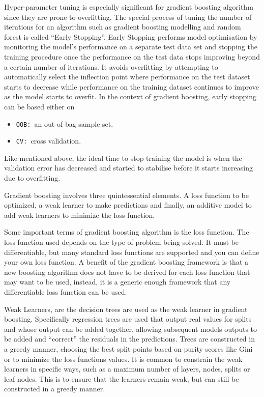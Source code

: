 \documentclass[12pt]{article}
\begin{document}
Hyper-parameter tuning is especially significant for gradient boosting algorithm since they are prone to overfitting. The special process of tuning the number of iterations for an algorithm such as gradient boosting modelling and random forest is called “Early Stopping”. Early Stopping performs model optimisation by monitoring the model’s performance on a separate test data set and stopping the training procedure once the performance on the test data stops improving beyond a certain number of iterations. It avoids overfitting by attempting to automatically select the inflection point where performance on the test dataset starts to decrease while performance on the training dataset continues to improve as the model starts to overfit. In the context of gradient boosting, early stopping can be based either on 
\begin{itemize}
\item
\texttt{OOB: }an out of bag sample set.
\item
\texttt{CV: }cross validation.
\end{itemize}
Like mentioned above, the ideal time to stop training the model is when the validation error has decreased and started to stabilise before it starts increasing due to overfitting.

Gradient boosting involves three quintessential elements. A loss function to be optimized, a weak learner to make predictions and finally, an additive model to add weak learners to minimize the loss function.

Some important terms of gradient boosting algorithm is the loss function. The loss function used depends on the type of problem being solved. It must be differentiable, but many standard loss functions are supported and you can define your own loss function. A benefit of the gradient boosting framework is that a new boosting algorithm does not have to be derived for each loss function that may want to be used, instead, it is a generic enough framework that any differentiable loss function can be used.

Weak Learners, are the decision trees are used as the weak learner in gradient boosting. Specifically regression trees are used that output real values for splits and whose output can be added together, allowing subsequent models outputs to be added and “correct” the residuals in the predictions. Trees are constructed in a greedy manner, choosing the best split points based on purity scores like Gini or to minimize the loss functions values. It is common to constrain the weak learners in specific ways, such as a maximum number of layers, nodes, splits or leaf nodes. This is to ensure that the learners remain weak, but can still be constructed in a greedy manner.
\end{document}
